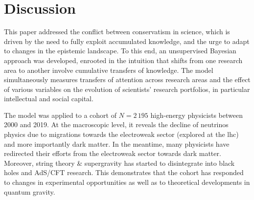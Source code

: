\documentclass{article}
\begin{document}
\section{Discussion}

This paper addressed the conflict between conservatism in science, which is driven by the need to fully exploit accumulated knowledge, and the urge to adapt to changes in the epistemic landscape. To this end, an unsupervised Bayesian approach was developed, enrooted in the intuition that shifts from one research area to another involve cumulative transfers of knowledge. The model simultaneously measures transfers of attention across research areas and the effect of various variables on the evolution of scientists' research portfolios, in particular intellectual and social capital.






The model was applied to a cohort of $N=2\,195$ high-energy physicists between 2000 and 2019. At the macroscopic level, it reveals the decline of neutrinos physics due to migrations towards the electroweak sector (explored at the \gls{lhc}) and more importantly dark matter. In the meantime, many physicists have redirected their efforts from the electroweak sector towards dark matter. Moreover, string theory \& supergravity has started to disintegrate into black holes and AdS/CFT research. This demonstrates that the cohort has responded to changes in experimental opportunities as well as to theoretical developments in quantum gravity.
\end{document}
